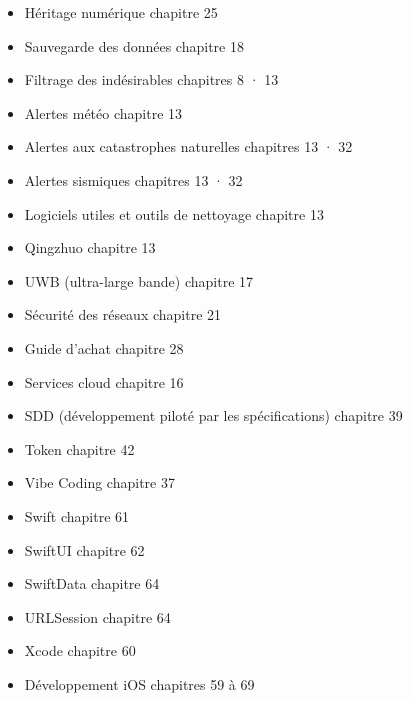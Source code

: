 \begin{itemize}
  \item Héritage numérique chapitre 25
  \item Sauvegarde des données chapitre 18
  \item Filtrage des indésirables chapitres 8 · 13
  \item Alertes météo chapitre 13
  \item Alertes aux catastrophes naturelles chapitres 13 · 32
  \item Alertes sismiques chapitres 13 · 32
  \item Logiciels utiles et outils de nettoyage chapitre 13
  \item Qingzhuo chapitre 13
  \item UWB (ultra-large bande) chapitre 17
  \item Sécurité des réseaux chapitre 21
  \item Guide d'achat chapitre 28
  \item Services cloud chapitre 16
  \item SDD (développement piloté par les spécifications) chapitre 39
  \item Token chapitre 42
  \item Vibe Coding chapitre 37
  \item Swift chapitre 61
  \item SwiftUI chapitre 62
  \item SwiftData chapitre 64
  \item URLSession chapitre 64
  \item Xcode chapitre 60
  \item Développement iOS chapitres 59 à 69
\end{itemize}


